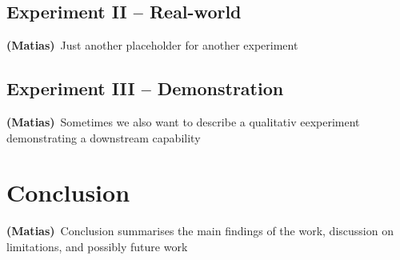 \documentclass[letterpaper, 10 pt, conference]{ieeeconf}
\newcommand{\matias}[1]{\textcolor{RubineRed}{\textbf{(Matias)}~#1}}
\begin{document}
\textcolor{Gray}{\lipsum[1]}


\subsection{Experiment II -- Real-world}
\matias{Just another placeholder for another experiment}

\textcolor{Gray}{\lipsum[1]}

\subsection{Experiment III -- Demonstration}
\matias{Sometimes we also want to describe a qualitativ eexperiment demonstrating a downstream capability}

\textcolor{Gray}{\lipsum[1]}


\section{Conclusion}
\matias{Conclusion summarises the main findings of the work, discussion on limitations, and possibly future work}

\textcolor{Gray}{\lipsum[1-2]}




\balance



\end{document}
